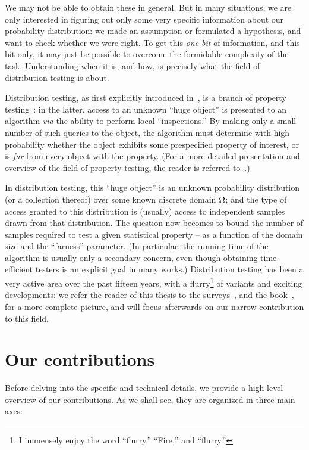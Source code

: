 We may not be able to obtain these in general. But in many situations, we are only interested in figuring out only some very specific information about our probability distribution: we made an assumption or formulated a hypothesis, and want to check whether we were right. To get this \emph{one bit} of information, and this bit only, it may just be possible to overcome the formidable complexity of the task. Understanding when it is, and how, is precisely what the field of distribution testing is about.

Distribution testing, as first explicitly introduced in~\cite{BFRSW:00}, is a branch of property testing~\cite{RS:96,GGR:98}: in the latter, access to an unknown ``huge object'' is presented to an algorithm \textit{via} the ability to perform local ``inspections.'' By making only a small number of such queries to the object, the algorithm must determine with high probability whether the object exhibits some prespecified property of interest, or is \emph{far} from every object with the property. (For a more detailed presentation and overview of the field of property testing, the reader is referred to~\cite{Fischer:01,Ron:08,Ron:10,Goldreich:10,Gol:17,BY:17}.)

In distribution testing, this ``huge object'' is an unknown probability distribution (or a collection thereof) over some known discrete domain ${\Omega}$; and the type of access granted to this distribution is (usually) access to independent samples drawn from that distribution. The question now becomes to bound the number of samples required to test a given statistical property -- as a function of the domain size and the ``farness'' parameter. (In particular, the running time of the algorithm is usually only a secondary concern, even though obtaining time-efficient testers is an explicit goal in many works.) Distribution testing has been a very active area over the past fifteen years, with a flurry\footnote{I immensely enjoy the word ``flurry.'' ``Fire,'' and ``flurry.''}{} of variants and exciting developments: we refer the reader of this thesis to the surveys~\cite{Rubinfeld:12:Survey,Canonne:15:Survey}, and the book~\cite{Gol:17}, for a more complete picture, and will focus afterwards on our narrow contribution to this field.

\section*{Our contributions}
Before delving into the specific and technical details, we provide a high-level overview of our contributions. As we shall see, they are organized in three main axes:

